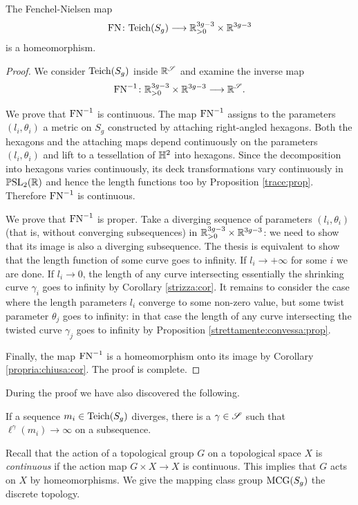 \begin{prop} \label{FN:omeom:prop}
The Fenchel-Nielsen map 
$${\rm FN}\colon {\rm Teich}(S_g) \longrightarrow \mathbb{R}_{>0}^{3g-3}\times\mathbb{R}^{3g-3}$$
is a homeomorphism.
\end{prop}
\begin{proof}
We consider ${\rm Teich}(S_g)$ inside $\mathbb{R}^\mathscr{S}$ and examine the inverse map
$${\rm FN}^{-1}\colon\mathbb{R}_{>0}^{3g-3}\times\mathbb{R}^{3g-3} \longrightarrow \mathbb{R}^\mathscr{S}.$$

We prove that ${\rm FN}^{-1}$ is continuous. The map ${\rm FN}^{-1}$ assigns to the parameters $(l_i, \theta_i)$ a metric on $S_g$ constructed by attaching right-angled hexagons. Both the hexagons and the attaching maps depend continuously on the parameters $(l_i, \theta_i)$ and lift to a tessellation of $\mathbb{H}^2$ into hexagons. Since the decomposition into hexagons varies continuously, its deck transformations vary continuously in $\mathbb{P}{\rm SL}_2(\mathbb{R})$ and hence the length functions too by Proposition \ref{trace:prop}. Therefore ${\rm FN}^{-1}$ is continuous.

We prove that ${\rm FN}^{-1}$ is proper. Take a diverging sequence of parameters $(l_i,\theta_i)$ (that is, without converging subsequences) in $\mathbb{R}_{>0}^{3g-3}\times \mathbb{R}^{3g-3}$: we need to show that its image is also a diverging subsequence. The thesis is equivalent to show that the length function of some curve goes to infinity. If $l_i\to +\infty$ for some $i$ we are done. If $l_i\to 0$, the length of any curve intersecting essentially the shrinking curve $\gamma_i$ goes to infinity by Corollary \ref{strizza:cor}. It remains to consider the case where the length parameters $l_i$ converge to some non-zero value, but some twist parameter $\theta_j$ goes to infinity: in that case the length of any curve intersecting the twisted curve $\gamma_j$ goes to infinity by Proposition \ref{strettamente:convessa:prop}.

Finally, the map ${\rm FN}^{-1}$ is a homeomorphism onto its image by Corollary \ref{propria:chiusa:cor}. The proof is complete.
\end{proof}

During the proof we have also discovered the following.

\begin{prop} \label{diverges:infinity:prop}
If a sequence $m_i\in{\rm Teich}(S_g)$ diverges, there is a $\gamma \in \mathscr{S}$ such that $\ell^\gamma(m_i) \to \infty$ on a subsequence.
\end{prop}

Recall that the action of a topological group $G$ on a topological space $X$ is \emph{continuous} if the action map $G\times X \to X$ is continuous. This implies that $G$ acts on $X$ by homeomorphisms. We give the mapping class group ${\rm MCG}(S_g)$ the discrete topology.

